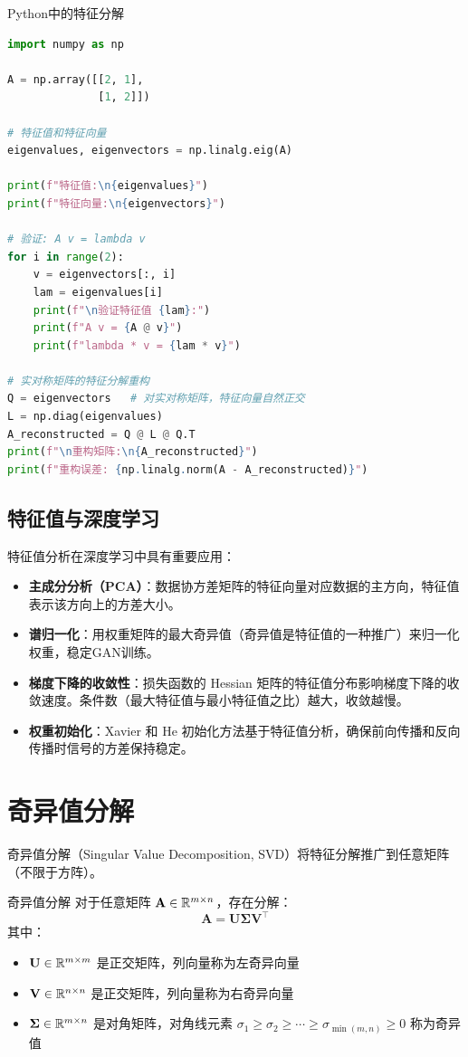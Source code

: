 \begin{mycode}{Python中的特征分解}
\begin{lstlisting}[language=Python]
import numpy as np

A = np.array([[2, 1],
              [1, 2]])

# 特征值和特征向量
eigenvalues, eigenvectors = np.linalg.eig(A)

print(f"特征值:\n{eigenvalues}")
print(f"特征向量:\n{eigenvectors}")

# 验证: A v = lambda v
for i in range(2):
    v = eigenvectors[:, i]
    lam = eigenvalues[i]
    print(f"\n验证特征值 {lam}:")
    print(f"A v = {A @ v}")
    print(f"lambda * v = {lam * v}")

# 实对称矩阵的特征分解重构
Q = eigenvectors   # 对实对称矩阵，特征向量自然正交
L = np.diag(eigenvalues)
A_reconstructed = Q @ L @ Q.T
print(f"\n重构矩阵:\n{A_reconstructed}")
print(f"重构误差: {np.linalg.norm(A - A_reconstructed)}")
\end{lstlisting}
\end{mycode}

\subsection{特征值与深度学习}

特征值分析在深度学习中具有重要应用：

\begin{itemize}
    \item \textbf{主成分分析（PCA）}：数据协方差矩阵的特征向量对应数据的主方向，特征值表示该方向上的方差大小。
    \item \textbf{谱归一化}：用权重矩阵的最大奇异值（奇异值是特征值的一种推广）来归一化权重，稳定GAN训练。
    \item \textbf{梯度下降的收敛性}：损失函数的 Hessian 矩阵的特征值分布影响梯度下降的收敛速度。条件数（最大特征值与最小特征值之比）越大，收敛越慢。
    \item \textbf{权重初始化}：Xavier 和 He 初始化方法基于特征值分析，确保前向传播和反向传播时信号的方差保持稳定。
\end{itemize}

\section{奇异值分解}

奇异值分解（Singular Value Decomposition, SVD）将特征分解推广到任意矩阵（不限于方阵）。

\begin{myTheorem}{奇异值分解}
对于任意矩阵 $\mathbf{A}\in\mathbb{R}^{m\times n}$，存在分解：
\[
\mathbf{A} = \mathbf{U}\boldsymbol{\Sigma}\mathbf{V}^{\top}
\]
其中：
\begin{itemize}
    \item $\mathbf{U}\in\mathbb{R}^{m\times m}$ 是正交矩阵，列向量称为左奇异向量
    \item $\mathbf{V}\in\mathbb{R}^{n\times n}$ 是正交矩阵，列向量称为右奇异向量
    \item $\boldsymbol{\Sigma}\in\mathbb{R}^{m\times n}$ 是对角矩阵，对角线元素 $\sigma_1\geq\sigma_2\geq\cdots\geq\sigma_{\min(m,n)}\geq 0$ 称为奇异值
\end{itemize}
\end{myTheorem}

